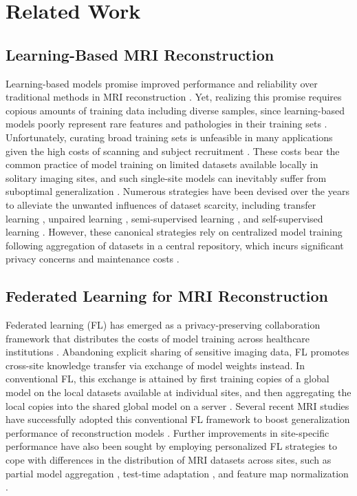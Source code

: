 \section{Related Work}
\subsection{Learning-Based MRI Reconstruction}
Learning-based models promise improved performance and reliability over traditional methods in MRI reconstruction \cite{Hammernik2017}. Yet, realizing this promise requires copious amounts of training data including diverse samples, since learning-based models poorly represent rare features and pathologies in their training sets \cite{data_diff}. Unfortunately, curating broad training sets is unfeasible in many applications given the high costs of scanning and subject recruitment \cite{GuoTMI2021}. These costs bear the common practice of model training on limited datasets available locally in solitary imaging sites, and such single-site models can inevitably suffer from suboptimal generalization \cite{dalmaz2024one}. Numerous strategies have been devised over the years to alleviate the unwanted influences of dataset scarcity, including transfer learning \cite{Dar2017}, unpaired learning \cite{Quan2018c, oh2020}, semi-supervised learning \cite{yurt2022semi}, and self-supervised learning \cite{yaman2020, FengLiu2021}. However, these canonical strategies rely on centralized model training following aggregation of datasets in a central repository, which incurs significant privacy concerns and maintenance costs \cite{kaissis2020secure}.

\subsection{Federated Learning for MRI Reconstruction}
Federated learning (FL) has emerged as a privacy-preserving collaboration framework that distributes the costs of model training across healthcare institutions \cite{kaissis2020secure}. Abandoning explicit sharing of sensitive imaging data, FL promotes cross-site knowledge transfer via exchange of model weights instead. In conventional FL, this exchange is attained by first training copies of a global model on the local datasets available at individual sites, and then aggregating the local copies into the shared global model on a server \cite{WenqiLi2019}. Several recent MRI studies have successfully adopted this conventional FL framework to boost generalization performance of reconstruction models \cite{guo2021,elmas2022federated,feng2023tmi}. Further improvements in site-specific performance have also been sought by employing personalized FL strategies to cope with differences in the distribution of MRI datasets across sites, such as partial model aggregation \cite{feng2023tmi}, test-time adaptation \cite{elmas2022federated}, and feature map normalization \cite{dalmaz2024one}. 

